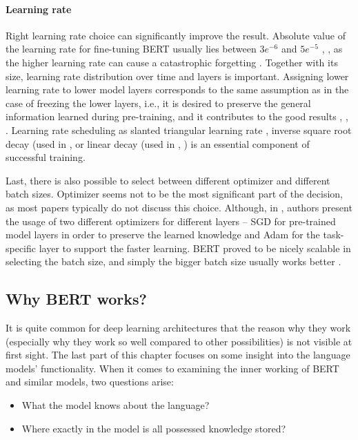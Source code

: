 \paragraph{Learning rate} Right learning rate choice can significantly improve the result. Absolute value of the learning rate for fine-tuning BERT usually lies between $3e^{-6}$ and $5e^{-5}$ \citep{Devlin2019}, \citep{Virtanen2019}, \citep{Kittask2020} as the higher learning rate can cause a catastrophic forgetting \citep{Sun}. Together with its size, learning rate distribution over time and layers is important. Assigning lower learning rate to lower model layers corresponds to the same assumption as in the case of freezing the lower layers, i.e., it is desired to preserve the general information learned during pre-training, and it contributes to the good results \citep{Ruder2018}, \citep{Sun}, \citep{Kondratyuk2019}. Learning rate scheduling as slanted triangular learning rate \citep{Ruder2018}, inverse square root decay (used in \citep{Kondratyuk2019}, \citep{Raffel2019} or linear decay (used in \citep{Liu2019}, \citep{Clark2020}) is an essential component of successful training.
\par
Last, there is also possible to select between different optimizer and different batch sizes. Optimizer seems not to be the most significant part of the decision, as most papers typically do not discuss this choice. Although, in \citep{Chronopoulou2019}, authors present the usage of two different optimizers for different layers -- SGD for pre-trained model layers in order to preserve the learned knowledge and Adam \citep{Kingma2015} for the task-specific layer to support the faster learning. BERT proved to be nicely scalable in selecting the batch size, and simply the bigger batch size usually works better \citep{Liu2019}.
\subsection{Why BERT works?}
\label{sub:specialBert}
It is quite common for deep learning architectures that the reason why they work (especially why they work so well compared to other possibilities) is not visible at first sight. The last part of this chapter focuses on some insight into the language models' functionality. When it comes to examining the inner working of BERT and similar models, two questions arise:
\begin{itemize}
\item What the model knows about the language?
\item Where exactly in the model is all possessed knowledge stored?
\end{itemize}

